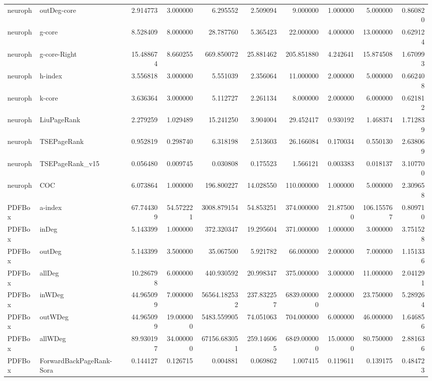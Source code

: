 \begin{tabular}{llrrrrrrrr}
neuroph & outDeg-core & 2.914773 & 3.000000 & 6.295552 & 2.509094 & 9.000000 & 1.000000 & 5.000000 & 0.860820 \\
neuroph & g-core & 8.528409 & 8.000000 & 28.787760 & 5.365423 & 22.000000 & 4.000000 & 13.000000 & 0.629124 \\
neuroph & g-core-Right & 15.488674 & 8.660255 & 669.850072 & 25.881462 & 205.851880 & 4.242641 & 15.874508 & 1.670993 \\
neuroph & h-index & 3.556818 & 3.000000 & 5.551039 & 2.356064 & 11.000000 & 2.000000 & 5.000000 & 0.662408 \\
neuroph & k-core & 3.636364 & 3.000000 & 5.112727 & 2.261134 & 8.000000 & 2.000000 & 6.000000 & 0.621812 \\
neuroph & LiuPageRank & 2.279259 & 1.029489 & 15.241250 & 3.904004 & 29.452417 & 0.930192 & 1.468374 & 1.712839 \\
neuroph & TSEPageRank & 0.952819 & 0.298740 & 6.318198 & 2.513603 & 26.166084 & 0.170034 & 0.550130 & 2.638069 \\
neuroph & TSEPageRank_v15 & 0.056480 & 0.009745 & 0.030808 & 0.175523 & 1.566121 & 0.003383 & 0.018137 & 3.107700 \\
neuroph & COC & 6.073864 & 1.000000 & 196.800227 & 14.028550 & 110.000000 & 1.000000 & 5.000000 & 2.309658 \\
PDFBox & a-index & 67.744309 & 54.572221 & 3008.879154 & 54.853251 & 374.000000 & 21.875000 & 106.155767 & 0.809710 \\
PDFBox & inDeg & 5.143399 & 1.000000 & 372.320347 & 19.295604 & 371.000000 & 1.000000 & 3.000000 & 3.751528 \\
PDFBox & outDeg & 5.143399 & 3.500000 & 35.067500 & 5.921782 & 66.000000 & 2.000000 & 7.000000 & 1.151336 \\
PDFBox & allDeg & 10.286798 & 6.000000 & 440.930592 & 20.998347 & 375.000000 & 3.000000 & 11.000000 & 2.041291 \\
PDFBox & inWDeg & 44.965099 & 7.000000 & 56564.182532 & 237.832257 & 6839.000000 & 2.000000 & 23.750000 & 5.289264 \\
PDFBox & outWDeg & 44.965099 & 19.000000 & 5483.559905 & 74.051063 & 704.000000 & 6.000000 & 46.000000 & 1.646856 \\
PDFBox & allWDeg & 89.930197 & 34.000000 & 67156.683051 & 259.146065 & 6849.000000 & 15.000000 & 80.750000 & 2.881636 \\
PDFBox & ForwardBackPageRank-Sora & 0.144127 & 0.126715 & 0.004881 & 0.069862 & 1.007415 & 0.119611 & 0.139175 & 0.484723 \\

\end{tabular}
